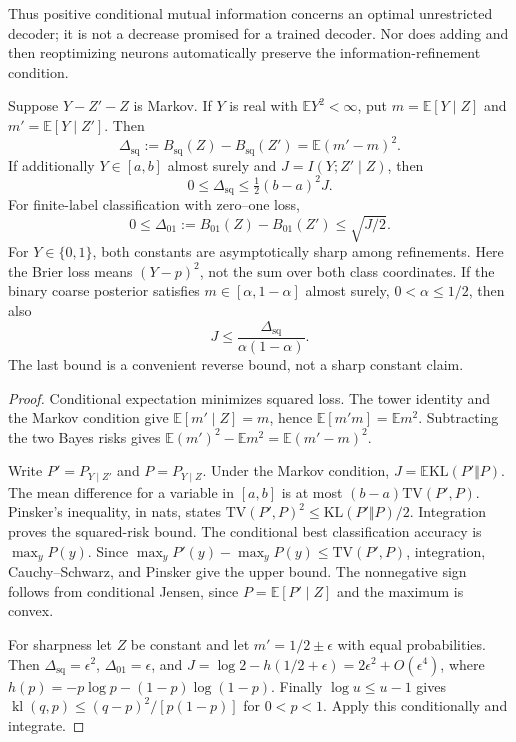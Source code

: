 Thus positive conditional mutual information concerns an optimal
unrestricted decoder; it is not a decrease promised for a trained decoder.
Nor does adding and then reoptimizing neurons automatically preserve the
information-refinement condition.

\begin{proposition}
\label{prop:p7-basic-bounds}
Suppose $Y-Z'-Z$ is Markov. If $Y$ is real with
$\mathbb E Y^2<\infty$, put $m=\mathbb E[Y\mid Z]$ and
$m'=\mathbb E[Y\mid Z']$. Then
\[
 \Delta_{\mathrm{sq}}:=B_{\mathrm{sq}}(Z)-B_{\mathrm{sq}}(Z')
 =\mathbb E(m'-m)^2.
\]
If additionally $Y\in[a,b]$ almost surely and
$J=I(Y;Z'\mid Z)$, then
\[
 0\le\Delta_{\mathrm{sq}}\le\tfrac12(b-a)^2 J.
\]
For finite-label classification with zero--one loss,
\[
 0\le\Delta_{01}:=B_{01}(Z)-B_{01}(Z')\le\sqrt{J/2}.
\]
For $Y\in\{0,1\}$, both constants are asymptotically sharp among
refinements. Here the Brier loss means $(Y-p)^2$, not the sum over both
class coordinates. If the binary coarse posterior satisfies
$m\in[\alpha,1-\alpha]$ almost surely, $0<\alpha\le1/2$, then also
\[
 J\le\frac{\Delta_{\mathrm{sq}}}{\alpha(1-\alpha)}.
\]
The last bound is a convenient reverse bound, not a sharp constant claim.
\end{proposition}
\begin{proof}
Conditional expectation minimizes squared loss. The tower identity and
the Markov condition give $\mathbb E[m'\mid Z]=m$, hence
$\mathbb E[m'm]=\mathbb E m^2$. Subtracting the two Bayes risks gives
$\mathbb E(m')^2-\mathbb E m^2=\mathbb E(m'-m)^2$.

Write $P'=P_{Y\mid Z'}$ and $P=P_{Y\mid Z}$. Under the Markov
condition, $J=\mathbb E\mathrm{KL}(P'\Vert P)$.
The mean difference for a variable in $[a,b]$ is at most
$(b-a)\mathrm{TV}(P',P)$. Pinsker's inequality, in nats, states
$\mathrm{TV}(P',P)^2\le\mathrm{KL}(P'\Vert P)/2$.
Integration proves the squared-risk bound.
The conditional best classification accuracy is $\max_y P(y)$.
Since $\max_y P'(y)-\max_y P(y)\le\mathrm{TV}(P',P)$,
integration, Cauchy--Schwarz, and Pinsker give the upper bound.
The nonnegative sign follows from conditional Jensen, since
$P=\mathbb E[P'\mid Z]$ and the maximum is convex.

For sharpness let $Z$ be constant and let $m'=1/2\pm\epsilon$ with
equal probabilities. Then $\Delta_{\mathrm{sq}}=\epsilon^2$,
$\Delta_{01}=\epsilon$, and
$J=\log2-h(1/2+\epsilon)=2\epsilon^2+O(\epsilon^4)$, where
$h(p)=-p\log p-(1-p)\log(1-p)$.
Finally $\log u\le u-1$ gives
$\operatorname{kl}(q,p)\le(q-p)^2/[p(1-p)]$ for $0<p<1$.
Apply this conditionally and integrate.
\end{proof}

